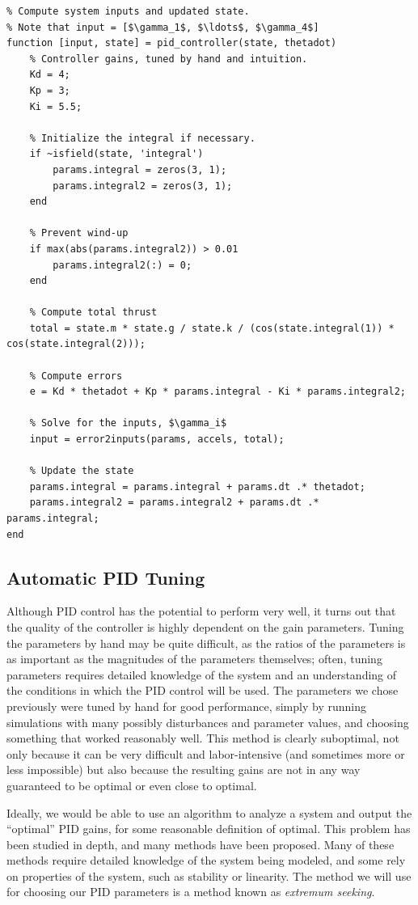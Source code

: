 \documentclass{article}
\begin{document}
\begin{verbatim}
% Compute system inputs and updated state.
% Note that input = [$\gamma_1$, $\ldots$, $\gamma_4$]
function [input, state] = pid_controller(state, thetadot)
    % Controller gains, tuned by hand and intuition.
    Kd = 4;
    Kp = 3;
    Ki = 5.5;

    % Initialize the integral if necessary.
    if ~isfield(state, 'integral')
        params.integral = zeros(3, 1);
        params.integral2 = zeros(3, 1);
    end

    % Prevent wind-up
    if max(abs(params.integral2)) > 0.01
        params.integral2(:) = 0;
    end

    % Compute total thrust
    total = state.m * state.g / state.k / (cos(state.integral(1)) * cos(state.integral(2)));

    % Compute errors
    e = Kd * thetadot + Kp * params.integral - Ki * params.integral2;

    % Solve for the inputs, $\gamma_i$
    input = error2inputs(params, accels, total);

    % Update the state
    params.integral = params.integral + params.dt .* thetadot;
    params.integral2 = params.integral2 + params.dt .* params.integral;
end
\end{verbatim}
\pagebreak

\subsection*{Automatic PID Tuning}
Although PID control has the potential to perform very well, it turns out that the quality of the
controller is highly dependent on the gain parameters. Tuning the parameters by hand may be quite
difficult, as the ratios of the parameters is as important as the magnitudes of the parameters
themselves; often, tuning parameters requires detailed knowledge of the system and an understanding
of the conditions in which the PID control will be used. The parameters we chose previously were
tuned by hand for good performance, simply by running simulations with many possibly disturbances
and parameter values, and choosing something that worked reasonably well. This method is clearly
suboptimal, not only because it can be very difficult and labor-intensive (and sometimes more or
less impossible) but also because the resulting gains are not in any way guaranteed to be optimal or
even close to optimal.

Ideally, we would be able to use an algorithm to analyze a system and output the ``optimal'' PID
gains, for some reasonable definition of optimal. This problem has been studied in depth, and many
methods have been proposed. Many of these methods require detailed knowledge of the system being
modeled, and some rely on properties of the system, such as stability or linearity. The method we
will use for choosing our PID parameters is a method known as \emph{extremum seeking}.
\end{document}
